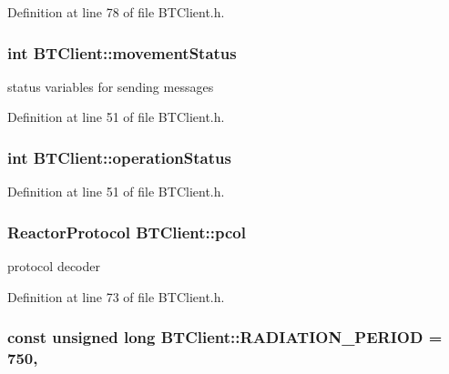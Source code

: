 Definition at line 78 of file B\-T\-Client.\-h.

\hypertarget{classBTClient_aacff467239e0a6a85eab0ac77dbcfdf8}{
\subsubsection[{movement\-Status}]{\setlength{\rightskip}{0pt plus 5cm}int B\-T\-Client\-::movement\-Status}}\label{classBTClient_aacff467239e0a6a85eab0ac77dbcfdf8}


status variables for sending messages 



Definition at line 51 of file B\-T\-Client.\-h.

\hypertarget{classBTClient_a419405603d661e07e630a6649e9592a0}{
\subsubsection[{operation\-Status}]{\setlength{\rightskip}{0pt plus 5cm}int B\-T\-Client\-::operation\-Status}}\label{classBTClient_a419405603d661e07e630a6649e9592a0}


Definition at line 51 of file B\-T\-Client.\-h.

\hypertarget{classBTClient_a64bd4b5e464d0b6a57957428ef559142}{
\subsubsection[{pcol}]{\setlength{\rightskip}{0pt plus 5cm}Reactor\-Protocol B\-T\-Client\-::pcol\hspace{0.3cm}{\ttfamily [private]}}}\label{classBTClient_a64bd4b5e464d0b6a57957428ef559142}


protocol decoder 



Definition at line 73 of file B\-T\-Client.\-h.

\hypertarget{classBTClient_af104d8cffa9b3360c2b28acf07acc03a}{
\subsubsection[{R\-A\-D\-I\-A\-T\-I\-O\-N\-\_\-\-P\-E\-R\-I\-O\-D}]{\setlength{\rightskip}{0pt plus 5cm}const unsigned long B\-T\-Client\-::\-R\-A\-D\-I\-A\-T\-I\-O\-N\-\_\-\-P\-E\-R\-I\-O\-D = 750\hspace{0.3cm}{\ttfamily [static]}, {\ttfamily [private]}}}\label{classBTClient_af104d8cffa9b3360c2b28acf07acc03a}


